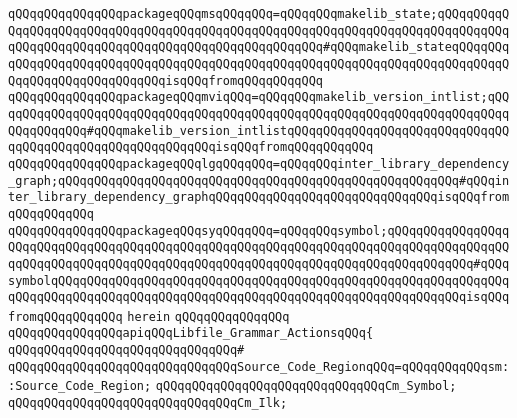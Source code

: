 \verb|qQQqqQQqqQQqqQQqpackageqQQqmsqQQqqQQq=qQQqqQQqmakelib_state;qQQqqQQqqQQqqQQqqQQqqQQqqQQqqQQqqQQqqQQqqQQqqQQqqQQqqQQqqQQqqQQqqQQqqQQqqQQqqQQqqQQqqQQqqQQqqQQqqQQqqQQqqQQqqQQqqQQqqQQqqQQq#qQQqmakelib_stateqQQqqQQqqQQqqQQqqQQqqQQqqQQqqQQqqQQqqQQqqQQqqQQqqQQqqQQqqQQqqQQqqQQqqQQqqQQqqQQqqQQqqQQqqQQqqQQqqQQqisqQQqfromqQQqqQQqqQQq|\newline
\verb|qQQqqQQqqQQqqQQqpackageqQQqmviqQQq=qQQqqQQqmakelib_version_intlist;qQQqqQQqqQQqqQQqqQQqqQQqqQQqqQQqqQQqqQQqqQQqqQQqqQQqqQQqqQQqqQQqqQQqqQQqqQQqqQQqqQQq#qQQqmakelib_version_intlistqQQqqQQqqQQqqQQqqQQqqQQqqQQqqQQqqQQqqQQqqQQqqQQqqQQqqQQqqQQqisqQQqfromqQQqqQQqqQQq|\newline
\verb|qQQqqQQqqQQqqQQqpackageqQQqlgqQQqqQQq=qQQqqQQqinter_library_dependency_graph;qQQqqQQqqQQqqQQqqQQqqQQqqQQqqQQqqQQqqQQqqQQqqQQqqQQqqQQq#qQQqinter_library_dependency_graphqQQqqQQqqQQqqQQqqQQqqQQqqQQqqQQqisqQQqfromqQQqqQQqqQQq|\newline
\verb|qQQqqQQqqQQqqQQqpackageqQQqsyqQQqqQQq=qQQqqQQqsymbol;qQQqqQQqqQQqqQQqqQQqqQQqqQQqqQQqqQQqqQQqqQQqqQQqqQQqqQQqqQQqqQQqqQQqqQQqqQQqqQQqqQQqqQQqqQQqqQQqqQQqqQQqqQQqqQQqqQQqqQQqqQQqqQQqqQQqqQQqqQQqqQQqqQQqqQQq#qQQqsymbolqQQqqQQqqQQqqQQqqQQqqQQqqQQqqQQqqQQqqQQqqQQqqQQqqQQqqQQqqQQqqQQqqQQqqQQqqQQqqQQqqQQqqQQqqQQqqQQqqQQqqQQqqQQqqQQqqQQqqQQqqQQqqQQqisqQQqfromqQQqqQQqqQQq|\newline
\verb|herein|\newline
\verb|qQQqqQQqqQQqqQQq|\newline
\verb|qQQqqQQqqQQqqQQqapiqQQqLibfile_Grammar_ActionsqQQq{|\newline
\verb|qQQqqQQqqQQqqQQqqQQqqQQqqQQqqQQq#|\newline
\verb|qQQqqQQqqQQqqQQqqQQqqQQqqQQqqQQqSource_Code_RegionqQQq=qQQqqQQqqQQqsm::Source_Code_Region;|\newline
\newline
\verb|qQQqqQQqqQQqqQQqqQQqqQQqqQQqqQQqCm_Symbol;|\newline
\verb|qQQqqQQqqQQqqQQqqQQqqQQqqQQqqQQqCm_Ilk;|\newline
\newline
